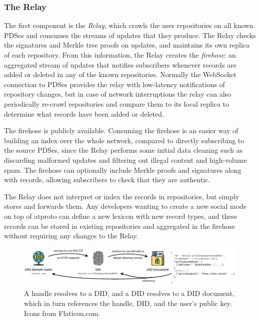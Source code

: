 \documentclass[sigconf]{acmart}
\begin{document}
\subsubsection{The Relay}\label{sec:relay}

The first component is the \emph{Relay}, which crawls the user repositories on all known PDSes and consumes the streams of updates that they produce.
The Relay checks the signatures and Merkle tree proofs on updates, and maintains its own replica of each repository.
From this information, the Relay creates the \emph{firehose}: an aggregated stream of updates that notifies subscribers whenever records are added or deleted in any of the known repositories.
Normally the WebSocket connection to PDSes provides the relay with low-latency notifications of repository changes, but in case of network interruptions the relay can also periodically re-crawl repositories and compare them to its local replica to determine what records have been added or deleted.

The firehose is publicly available.
Consuming the firehose is an easier way of building an index over the whole network, compared to directly subscribing to the source PDSes, since the Relay performs some initial data cleaning such as discarding malformed updates and filtering out illegal content and high-volume spam.
The firehose can optionally include Merkle proofs and signatures along with records, allowing subscribers to check that they are authentic.

The Relay does not interpret or index the records in repositories, but simply stores and forwards them.
Any developers wanting to create a new social mode on top of atproto can define a new lexicon with new record types, and these records can be stored in existing repositories and aggregated in the firehose without requiring any changes to the Relay.

\begin{figure}
    \centering
    \includegraphics[width=\linewidth]{identity.pdf}
    \caption{A handle resolves to a DID, and a DID resolves to a DID document, which in turn references the handle, DID, and the user's public key. Icons from Flaticon.com.}
    \label{fig:identity}
\end{figure}
\end{document}
